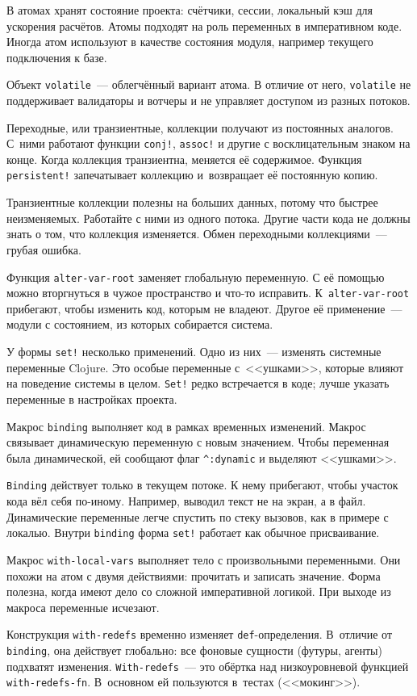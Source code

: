 В атомах хранят состояние проекта: счётчики, сессии, локальный кэш для ускорения
расчётов. Атомы подходят на роль переменных в императивном коде. Иногда атом
используют в качестве состояния модуля, например текущего подключения к базе.

Объект \verb|volatile|~--- облегчённый вариант атома. В отличие от него,
\verb|volatile| не поддерживает валидаторы и вотчеры и не управляет доступом из
разных потоков.

Переходные, или транзиентные, коллекции получают из постоянных аналогов. С~ними
работают функции \verb|conj!|, \verb|assoc!| и другие с восклицательным знаком
на конце.  Когда коллекция транзиентна, меняется её содержимое. Функция
\verb|persistent!| запечатывает коллекцию и~возвращает её постоянную копию.

Транзиентные коллекции полезны на больших данных, потому что быстрее
неизменяемых. Работайте с ними из одного потока. Другие части кода не должны
знать о том, что коллекция изменяется. Обмен переходными коллекциями~--- грубая
ошибка.

Функция \verb|alter-var-root| заменяет глобальную переменную. С её помощью можно
вторгнуться в чужое пространство и что-то исправить. К~\verb|alter-var-root|
прибегают, чтобы изменить код, которым не владеют. Другое её применение~---
модули с состоянием, из которых собирается система.

У формы \verb|set!| несколько применений. Одно из них~--- изменять системные
переменные Clojure. Это особые переменные с~<<ушками>>, которые влияют на
поведение системы в целом. \verb|Set!| редко встречается в коде; лучше указать
переменные в настройках проекта.

Макрос \verb|binding| выполняет код в рамках временных изменений. Макрос
связывает динамическую переменную с новым значением. Чтобы переменная была
динамической, ей сообщают флаг \verb|^:dynamic| и выделяют <<ушками>>.

\verb|Binding| действует только в текущем потоке. К нему прибегают, чтобы
участок кода вёл себя по-иному. Например, выводил текст не на экран, а в
файл. Динамические переменные легче спустить по стеку вызовов, как в примере с
локалью. Внутри \verb|binding| форма \verb|set!| работает как обычное
присваивание.

Макрос \verb|with-local-vars| выполняет тело с произвольными переменными. Они
похожи на атом с двумя действиями: прочитать и записать значение. Форма полезна,
когда имеют дело со сложной императивной логикой. При выходе из макроса
переменные исчезают.

Конструкция \verb|with-redefs| временно изменяет
\verb|def|-оп\-ре\-де\-ле\-ния. В~отличие от \verb|binding|, она действует глобально:
все фоновые сущности (футуры, агенты) подхватят
изменения. \verb|With-redefs|~--- это обёртка над низкоуровневой функцией
\verb|with-redefs-fn|. В~основном ей пользуются в~тестах (<<мокинг>>).

